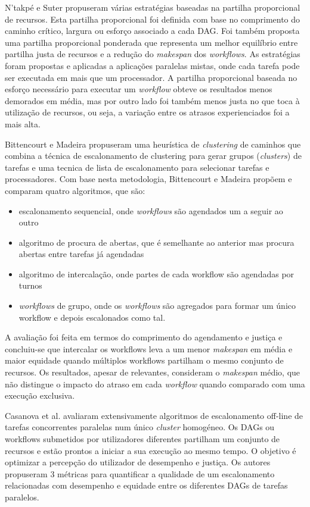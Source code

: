 N’takpé e Suter \cite{NTakpe2009} propuseram várias estratégias baseadas na partilha proporcional de recursos. Esta partilha proporcional foi definida com base no comprimento do caminho crítico, largura ou esforço associado a cada DAG. Foi também proposta uma partilha proporcional ponderada que representa um melhor equilíbrio entre partilha justa de recursos e a redução do \textit{makespan} dos \textit{workflows}. As estratégias foram propostas e aplicadas a aplicações paralelas mistas, onde cada tarefa pode ser executada em mais que um processador. A partilha proporcional baseada no esforço necessário para executar um \textit{workflow} obteve os resultados menos demorados em média, mas por outro lado foi também menos justa no que toca à utilização de recursos, ou seja, a variação entre os atrasos experienciados foi a mais alta.

Bittencourt e Madeira \cite{Bittencourt2010} propuseram uma heurística de \textit{clustering} de caminhos que combina a técnica de escalonamento de clustering para gerar grupos (\textit{clusters}) de tarefas e uma tecnica de lista de escalonamento para selecionar tarefas e processadores. Com base nesta metodologia, Bittencourt e Madeira propõem e comparam quatro algoritmos, que são:
\begin{itemize}
	\item escalonamento sequencial, onde \textit{workflows} são agendados um a seguir ao outro
	\item algoritmo de procura de abertas, que é semelhante ao anterior mas procura abertas entre tarefas já agendadas
	\item algoritmo de intercalação, onde partes de cada workflow são agendadas por turnos
	\item \textit{workflows} de grupo, onde os \textit{workflows} são agregados para formar um único workflow e depois escalonados como tal.
\end{itemize} 
A avaliação foi feita em termos do comprimento do agendamento e justiça e concluiu-se que intercalar os workflows leva a um menor \textit{makespan} em média e maior equidade quando múltiplos workflows partilham o mesmo conjunto de recursos. Os resultados, apesar de relevantes, consideram o \textit{makespan} médio, que não distingue o impacto do atraso em cada \textit{workflow} quando comparado com uma execução exclusiva.

Casanova et al. \cite{Casanova2010} avaliaram extensivamente algoritmos de escalonamento off-line de tarefas concorrentes paralelas num único \textit{cluster} homogéneo.
Os DAGs ou workflows submetidos por utilizadores diferentes partilham um conjunto de recursos e estão prontos a iniciar a sua execução ao mesmo tempo. O objetivo é optimizar a percepção do utilizador de desempenho e justiça. Os autores propuseram 3 métricas para quantificar a qualidade de um escalonamento relacionadas com desempenho e equidade entre os diferentes DAGs de tarefas paralelos.


